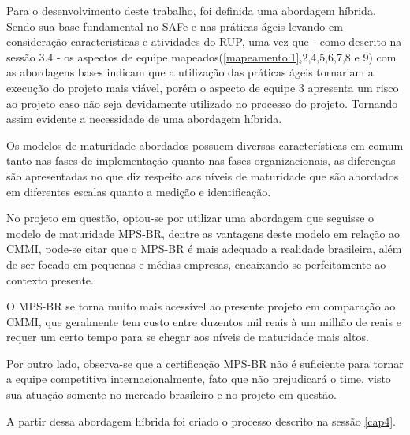 Para o desenvolvimento deste trabalho, foi definida uma abordagem híbrida.
Sendo sua base fundamental no SAFe e nas práticas ágeis levando em consideração
caracteristicas e atividades do RUP, uma vez que - como descrito na sessão 3.4
- os aspectos de equipe mapeados(\ref{mapeamento:1},2,4,5,6,7,8 e 9) com as abordagens bases
indicam que a utilização das práticas ágeis tornariam a execução do projeto mais
viável, porém o aspecto de equipe 3 apresenta um risco ao projeto caso não seja
devidamente utilizado no processo do projeto. Tornando assim evidente a necessidade
de uma abordagem híbrida.

Os modelos de maturidade abordados possuem diversas características em comum tanto nas fases
de implementação quanto nas fases organizacionais, as diferenças são apresentadas no que diz
respeito aos níveis de maturidade que são abordados em diferentes escalas quanto a medição e identificação.

No projeto em questão, optou-se por utilizar uma abordagem que seguisse o modelo de maturidade MPS-BR,
dentre as vantagens deste modelo em relação ao CMMI, pode-se citar que o MPS-BR é mais adequado a
realidade brasileira, além de ser focado em pequenas e médias empresas, encaixando-se
perfeitamente ao contexto presente.

O MPS-BR se torna muito mais acessível ao presente projeto em comparação ao CMMI,
que geralmente tem custo entre duzentos mil reais à um milhão de reais e requer um
certo tempo para se chegar aos níveis de maturidade mais altos.

Por outro lado, observa-se que a certificação MPS-BR não é suficiente para tornar
a equipe competitiva internacionalmente, fato que não prejudicará o time, visto sua
atuação somente no mercado brasileiro e no projeto em questão.

A partir dessa abordagem híbrida foi criado o processo descrito na sessão \ref{cap4}.
